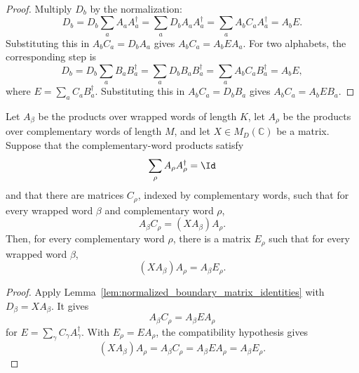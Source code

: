 \begin{proof}
    \leanok
    Multiply $D_b$ by the normalization:
    \[
        D_b
        =
        D_b\sum_a A_aA_a^\dagger
        =
        \sum_a D_bA_aA_a^\dagger
        =
        \sum_a A_bC_aA_a^\dagger
        =
        A_bE .
    \]
    Substituting this in $A_bC_a=D_bA_a$ gives
    $A_bC_a=A_bEA_a$.
    For two alphabets, the corresponding step is
    \[
        D_b
        =
        D_b\sum_a B_aB_a^\dagger
        =
        \sum_a D_bB_aB_a^\dagger
        =
        \sum_a A_bC_aB_a^\dagger
        =
        A_bE ,
    \]
    where $E=\sum_a C_aB_a^\dagger$.  Substituting this in
    $A_bC_a=D_bB_a$ gives $A_bC_a=A_bEB_a$.
\end{proof}

\begin{lemma}
    \label{lem:complementary_word_boundary_identities_from_pgvwc}
    \leanok
    Let $A_\beta$ be the products over wrapped words of length $K$, let
    $A_\rho$ be the products over complementary words of length $M$, and let
    $X\in M_D(\mathbb C)$ be a matrix.  Suppose that the complementary-word
    products satisfy
    \[
        \sum_\rho A_\rho A_\rho^\dagger=\Id
    \]
    and that there are matrices $C_\rho$, indexed by complementary words, such
    that for every wrapped word $\beta$ and complementary word $\rho$,
    \[
        A_\beta C_\rho=(X A_\beta)A_\rho.
    \]
    Then, for every complementary word $\rho$, there is a matrix $E_\rho$ such
    that for every wrapped word $\beta$,
    \[
        (X A_\beta)A_\rho=A_\beta E_\rho.
    \]
\end{lemma}

\begin{proof}
    \leanok
    Apply Lemma~\ref{lem:normalized_boundary_matrix_identities} with
    $D_\beta=X A_\beta$. It gives
    \[
        A_\beta C_\rho=A_\beta E A_\rho
    \]
    for $E=\sum_\gamma C_\gamma A_\gamma^\dagger$. With $E_\rho=EA_\rho$,
    the compatibility hypothesis gives
    \[
        (X A_\beta)A_\rho
        = A_\beta C_\rho
        = A_\beta E A_\rho
        = A_\beta E_\rho.
    \]
\end{proof}

